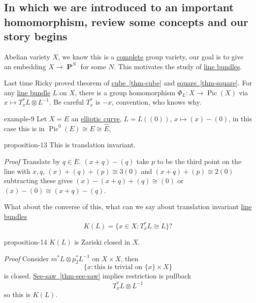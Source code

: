 \documentclass[10pt,]{book}
\makeatletter
\renewcommand*{\proofname}{Proof}
\renewenvironment{proof}[1][\proofname]{\par
  \pushQED{\qed}%
  \normalfont \topsep6\p@\@plus6\p@\relax
  \trivlist
  \item\relax
    {\itshape
    #1\@addpunct{.}}\hspace\labelsep\ignorespaces
}{%
  \popQED\endtrivlist\@endpefalse
}
\numberwithin{equation}{section}
\DeclareMathOperator{\Pic}{Pic}
\DeclareMathOperator{\PP}{\mathbf{P}}
\makeatother
\begin{document}
\subsection[{In which we are introduced to an important homomorphism, review some concepts and our story begins}]{In which we are introduced to an important homomorphism, review some concepts and our story begins}\label{subsection-13}
\hypertarget{p-133}{}%
Abelian variety  \(X\), we know this is a \hyperref[def-abelian-complete-var]{complete} group variety, our goal is to give an embedding \(X\to \PP^N\) for some \(N\). This motivates the study of \hyperref[def-line-bundle]{line bundles}.%
\par
\hypertarget{p-134}{}%
Last time Ricky proved theorem of \hyperref[thm-cube]{cube~\ref{thm-cube}} and \hyperref[thm-square]{square~\ref{thm-square}}. For any \hyperref[def-line-bundle]{line bundle}  \(L\) on \(X\), there is a group homomorphism \(\Phi_L\colon X \to \Pic(X)\) via \(x\mapsto T_x^* L\otimes L^{-1}\). Be careful \(T_x^*\) is \(-x\), convention, who knows why.%
\begin{example}{}{example-9}%
\hypertarget{p-135}{}%
Let \(X =E\) an \hyperref[def-supersing-isog-ec]{elliptic curve}, \(L = L((0))\), \(x\mapsto (x) - (0)\), in this case this is in \(\Pic^0(E) \cong E \cong \widehat E\), \begin{proposition}{}{}{proposition-13}%
\hypertarget{p-136}{}%
This is translation invariant.%
\end{proposition}
\begin{proof}\hypertarget{proof-23}{}
\hypertarget{p-137}{}%
Translate by \(q\in E\). \((x+q) - (q)\) take \(p\) to be the third point on the line with \(x,q\), \((x) + (q) + (p) \cong 3(0)\) and \((x+q) + (p) \cong 2 (0)\) subtracting these gives \((x) - (x+q) +(q) \cong (0)\) or \((x) - (0) \cong (x+q) -(q)\).%
\end{proof}
%
\end{example}
\hypertarget{p-138}{}%
What about the converse of this, what can we say about translation invariant \hyperref[def-line-bundle]{line bundles}%
\begin{equation*}
K(L) = \{x\in X : T_x^* L \cong L\}\text{?}
\end{equation*}
%
\begin{proposition}{}{}{proposition-14}%
\hypertarget{p-139}{}%
\(K(L)\) is Zariski closed in \(X\).%
\end{proposition}
\begin{proof}\hypertarget{proof-24}{}
\hypertarget{p-140}{}%
Consider \(m^* L \otimes p_2^*L^{-1}\) on \(X\times X\), then%
\begin{equation*}
\{x : \text{this is trivial on }\{x\}\times X\}
\end{equation*}
is closed. \hyperref[thm-see-saw]{See-saw~\ref{thm-see-saw}} implies restriction is pullback%
\begin{equation*}
T_x^*L \otimes L^{-1}
\end{equation*}
so this is \(K(L)\).%
\end{proof}
%
%
\typeout{************************************************}
\typeout{************************************************}
%
\end{document}
